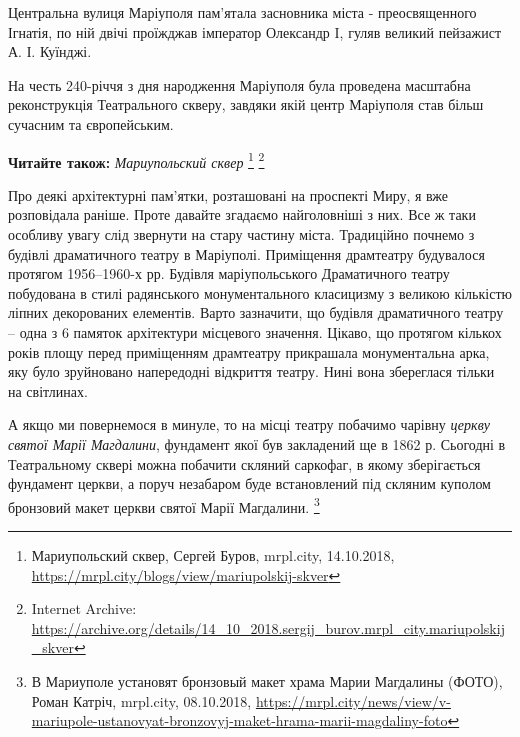 Центральна вулиця Маріуполя пам'ятала засновника міста - преосвященного
Ігнатія, по ній двічі проїжджав імператор Олександр I, гуляв великий пейзажист
А. І. Куїнджі.

На честь 240-річчя з дня народження Маріуполя була проведена масштабна
реконструкція Театрального скверу, завдяки якій центр Маріуполя став більш
сучасним та європейським.

\textbf{Читайте також:} \emph{Мариупольский сквер}%
\footnote{Мариупольский сквер, Сергей Буров, mrpl.city, 14.10.2018, \url{https://mrpl.city/blogs/view/mariupolskij-skver}} %
\footnote{Internet Archive: \url{https://archive.org/details/14_10_2018.sergij_burov.mrpl_city.mariupolskij_skver}}


Про деякі архітектурні пам'ятки, розташовані на проспекті Миру, я вже
розповідала раніше. Проте давайте згадаємо найголовніші з них. Все ж таки
особливу увагу слід звернути на стару частину міста. Традиційно почнемо з
будівлі драматичного театру в Маріуполі. Приміщення драмтеатру будувалося
протягом 1956–1960-х рр. Будівля маріупольського Драматичного театру побудована
в стилі радянського монументального класицизму з великою кількістю ліпних
декорованих елементів. Варто зазначити, що будівля драматичного театру – одна з
6 памяток архітектури місцевого значення. Цікаво, що протягом кількох років
площу перед приміщенням драмтеатру прикрашала монументальна арка, яку було
зруйновано напередодні відкриття театру. Нині вона збереглася тільки на
світлинах.


А якщо ми повернемося в минуле, то на місці театру побачимо чарівну \emph{церкву
святої Марії Магдалини}, фундамент якої був закладений ще в 1862 р. Сьогодні в
Театральному сквері можна побачити скляний саркофаг, в якому зберігається
фундамент церкви, а поруч незабаром буде встановлений під скляним куполом
бронзовий макет церкви святої Марії Магдалини.%
\footnote{В Мариуполе установят бронзовый макет храма Марии Магдалины (ФОТО), Роман Катріч, mrpl.city, 08.10.2018, \url{https://mrpl.city/news/view/v-mariupole-ustanovyat-bronzovyj-maket-hrama-marii-magdaliny-foto}}


